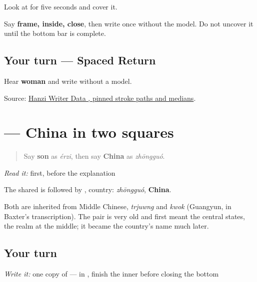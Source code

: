 Look at \textbf{} for five seconds and cover it.

Say \textbf{frame, inside, close}, then write \textbf{} once without the model. Do not uncover it until the bottom bar is complete.

\subsection*{Your turn — Spaced Return}
Hear \textbf{woman} and write  without a model.

\begin{tcolorbox}[breakable,colback=teal!4,colframe=teal!35!black,title={Before you move on}]
Source: \href{https://raw.githubusercontent.com/chanind/hanzi-writer-data/68d10a4b21150cae5e1ebbd223eed289cf32d90c/data/\%E5\%9B\%BD.json}{Hanzi Writer Data , pinned stroke paths and medians}.
\end{tcolorbox}
\section[\texorpdfstring{\zh{中国} (zhōngguó)}{中国 (zhōngguó)}]{ — China in two squares}

\label{lesson:ZH-C17-zhongguo}



\begin{quote}
Say \textbf{son} as \emph{érzi}, then say \textbf{China} as \emph{zhōngguó}.
\end{quote}

\begin{cousinweb}
\emph{Read it:} \textbf{} first, before the explanation

\begin{quote}
\textbf{}
\end{quote}

The shared  is followed by , country: \emph{zhōngguó}, \textbf{China}.

Both are inherited from Middle Chinese, \emph{trjuwng} and \emph{kwok} (Guangyun, in Baxter's transcription). The pair is very old and first meant the central states, the realm at the middle; it became the country's name much later.
\end{cousinweb}

\subsection*{Your turn}
\emph{Write it:} one copy of \textbf{} — in , finish the inner  before closing the bottom

